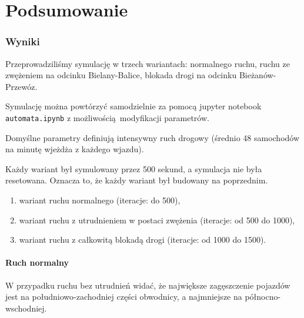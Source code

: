 \documentclass[a4paper,12pt]{article}
\begin{document}
    \part{Podsumowanie}

    \section{Wyniki}
    Przeprowadziliśmy symulację w trzech wariantach: normalnego ruchu, ruchu ze zwężeniem na odcinku Bielany-Balice, blokada drogi na odcinku Bieżanów-Przewóz.
    
    Symulację można powtórzyć samodzielnie za pomocą jupyter notebook \texttt{automata.ipynb} z możliwością modyfikacji parametrów.
    
    Domyślne parametry definiują intensywny ruch drogowy (średnio 48 samochodów na minutę wjeżdża z każdego wjazdu).
    
    Każdy wariant był symulowany przez 500 sekund, a symulacja nie była resetowana. Oznacza to, że każdy wariant był budowany na poprzednim.
    \begin{enumerate}
    	\item wariant ruchu normalnego (iteracje: do 500),
    	\item wariant ruchu z utrudnieniem w postaci zwężenia (iteracje: od 500 do 1000),
    	\item wariant ruchu z całkowitą blokadą drogi (iteracje: od 1000 do 1500).
    \end{enumerate}
    
    \subsection{Ruch normalny}
    W przypadku ruchu bez utrudnień widać, że największe zagęszczenie pojazdów jest na południowo-zachodniej części obwodnicy, a najmniejsze na północno-wschodniej.
    
\end{document}
